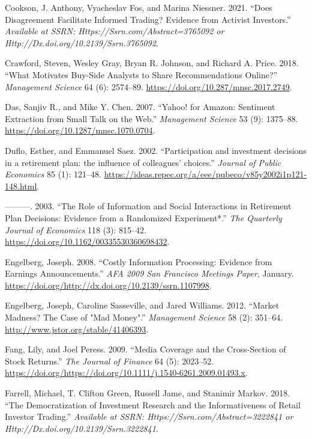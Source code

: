\documentclass[12pt,]{article}
\begin{document}
\leavevmode\hypertarget{ref-cookson2021}{}%
Cookson, J. Anthony, Vyacheslav Fos, and Marina Niessner. 2021. ``Does
Disagreement Facilitate Informed Trading? Evidence from Activist
Investors.'' \emph{Available at SSRN: Https://Ssrn.com/Abstract=3765092
or Http://Dx.doi.org/10.2139/Ssrn.3765092}.

\leavevmode\hypertarget{ref-crawford2018}{}%
Crawford, Steven, Wesley Gray, Bryan R. Johnson, and Richard A. Price.
2018. ``What Motivates Buy-Side Analysts to Share Recommendations
Online?'' \emph{Management Science} 64 (6): 2574--89.
\url{https://doi.org/10.287/mnsc.2017.2749}.

\leavevmode\hypertarget{ref-das2007}{}%
Das, Sanjiv R., and Mike Y. Chen. 2007. ``Yahoo! for Amazon: Sentiment
Extraction from Small Talk on the Web.'' \emph{Management Science} 53
(9): 1375--88. \url{https://doi.org/10.1287/mnsc.1070.0704}.

\leavevmode\hypertarget{ref-duflo2002}{}%
Duflo, Esther, and Emmanuel Saez. 2002. ``Participation and investment
decisions in a retirement plan: the influence of colleagues' choices.''
\emph{Journal of Public Economics} 85 (1): 121--48.
\url{https://ideas.repec.org/a/eee/pubeco/v85y2002i1p121-148.html}.

\leavevmode\hypertarget{ref-duflo2003}{}%
---------. 2003. ``The Role of Information and Social Interactions in
Retirement Plan Decisions: Evidence from a Randomized Experiment*.''
\emph{The Quarterly Journal of Economics} 118 (3): 815--42.
\url{https://doi.org/10.1162/00335530360698432}.

\leavevmode\hypertarget{ref-engelberg2008}{}%
Engelberg, Joseph. 2008. ``Costly Information Processing: Evidence from
Earnings Announcements.'' \emph{AFA 2009 San Francisco Meetings Paper},
January.
\href{https://doi.org/http://dx.doi.org/10.2139/ssrn.1107998\%20}{https://doi.org/http://dx.doi.org/10.2139/ssrn.1107998}.

\leavevmode\hypertarget{ref-engelberg2012}{}%
Engelberg, Joseph, Caroline Sasseville, and Jared Williams. 2012.
``Market Madness? The Case of "Mad Money".'' \emph{Management Science}
58 (2): 351--64. \url{http://www.jstor.org/stable/41406393}.

\leavevmode\hypertarget{ref-fang2009}{}%
Fang, Lily, and Joel Peress. 2009. ``Media Coverage and the
Cross-Section of Stock Returns.'' \emph{The Journal of Finance} 64 (5):
2023--52.
\url{https://doi.org/https://doi.org/10.1111/j.1540-6261.2009.01493.x}.

\leavevmode\hypertarget{ref-farrell2018}{}%
Farrell, Michael, T. Clifton Green, Russell Jame, and Stanimir Markov.
2018. ``The Democratization of Investment Research and the
Informativeness of Retail Investor Trading.'' \emph{Available at SSRN:
Https://Ssrn.com/Abstract=3222841 or
Http://Dx.doi.org/10.2139/Ssrn.3222841}.
\end{document}
